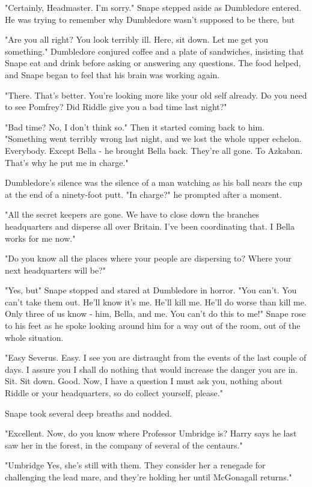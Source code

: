 "Certainly, Headmaster. I'm sorry." Snape stepped aside as Dumbledore entered. He was trying to remember why Dumbledore wasn't supposed to be there, but{\el}

"Are you all right? You look terribly ill. Here, sit down. Let me get you something." Dumbledore conjured coffee and a plate of sandwiches, insisting that Snape eat and drink before asking or answering any questions. The food helped, and Snape began to feel that his brain was working again.

"There. That's better. You're looking more like your old self already. Do you need to see Pomfrey? Did Riddle give you a bad time last night?"

"Bad time? No, I don't think so." Then it started coming back to him. "Something went terribly wrong last night, and we lost the whole upper echelon. Everybody. Except Bella - he brought Bella back. They're all gone. To Azkaban. That's why he put me in charge."

Dumbledore's silence was the silence of a man watching as his ball nears the cup at the end of a ninety-foot putt. "In charge?" he prompted after a moment.

"All the secret keepers are gone. We have to close down the branches{\el} headquarters{\el} and disperse all over Britain. I've been coordinating that. I{\el} Bella works for me now."

"Do you know all the places where your people are dispersing to? Where your next headquarters will be?"

"Yes, but{\el}" Snape stopped and stared at Dumbledore in horror. "You can't. You can't take them out. He'll know it's me. He'll kill me. He'll do worse than kill me. Only three of us know - him, Bella, and me. You can't do this to me!" Snape rose to his feet as he spoke looking around him for a way out of the room, out of the whole situation.

"Easy Severus. Easy. I see you are distraught from the events of the last couple of days. I assure you I shall do nothing that would increase the danger you are in. Sit. Sit down. Good. Now, I have a question I must ask you, nothing about Riddle or your headquarters, so do collect yourself, please."

Snape took several deep breaths and nodded.

"Excellent. Now, do you know where Professor Umbridge is? Harry says he last saw her in the forest, in the company of several of the centaurs."

"Umbridge{\el} Yes, she's still with them. They consider her a renegade for challenging the lead mare, and they're holding her until McGonagall returns."

